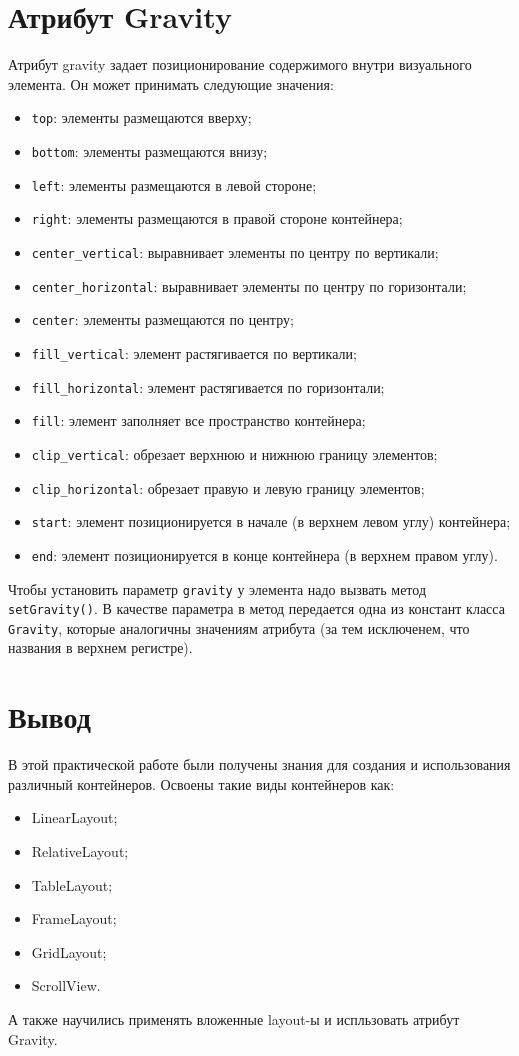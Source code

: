 \section{Атрибут Gravity}
Атрибут gravity задает позиционирование содержимого внутри 
визуального элемента. Он может принимать следующие значения:
\begin{itemize}
	\item \texttt{top}: элементы размещаются вверху;
	\item \texttt{bottom}: элементы размещаются внизу;
	\item \texttt{left}: элементы размещаются в левой стороне;
	\item \texttt{right}: элементы размещаются в правой стороне контейнера;
	\item \texttt{center\_vertical}: выравнивает элементы по центру
		по вертикали;
	\item \texttt{center\_horizontal}: выравнивает элементы по центру по
		горизонтали;
	\item \texttt{center}: элементы размещаются по центру;
	\item \texttt{fill\_vertical}: элемент растягивается по вертикали;
	\item \texttt{fill\_horizontal}: элемент растягивается по горизонтали;
	\item \texttt{fill}: элемент заполняет все пространство контейнера;
	\item \texttt{clip\_vertical}: обрезает верхнюю и нижнюю границу элементов;
	\item \texttt{clip\_horizontal}: обрезает правую и левую границу элементов;
	\item \texttt{start}: элемент позиционируется в начале
		(в верхнем левом углу) контейнера;
	\item \texttt{end}: элемент позиционируется в конце контейнера
		(в верхнем правом углу).
\end{itemize}

Чтобы установить параметр \texttt{gravity} у элемента надо вызвать метод 
\texttt{setGravity()}. В качестве параметра в метод передается одна из
констант класса \texttt{Gravity}, которые аналогичны значениям атрибута
(за тем исключенем, что названия в верхнем регистре).

\clearpage

\section*{\LARGE{Вывод}}
В этой практической работе были получены знания для создания и
использования различный контейнеров. Освоены такие виды контейнеров как:

\begin{itemize}
	\item LinearLayout;
	\item RelativeLayout;
	\item TableLayout;
	\item FrameLayout;
	\item GridLayout;
	\item ScrollView.
\end{itemize}

А также научились применять вложенные layout-ы и испльзовать
атрибут Gravity.

